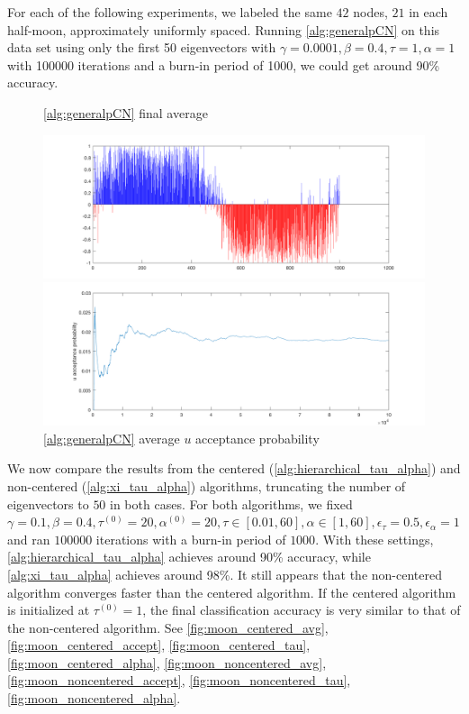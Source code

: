 \documentclass{siamart1116}
\begin{document}
For each of the following experiments, we labeled the same $42$ nodes, $21$ in each half-moon, approximately uniformly spaced. Running \cref{alg:generalpCN} on this data set using only the first 50 eigenvectors with $\gamma=0.0001,\beta=0.4,\tau=1,\alpha=1$ with 100000 iterations and a burn-in period of 1000, we could get around 90\% accuracy.
\begin{figure}[!htb]
    \begin{minipage}{0.48\textwidth}
        \centering
        \caption{\label{fig:moon_mcmc_gamma_avg} \cref{alg:generalpCN} final average}
        \includegraphics[width=\linewidth]{graphics/moons/mcmc_gamma/u_avg.png}
    \end{minipage} \hfill
    \begin{minipage}{0.48\textwidth}
        \centering
        \caption{\label{fig:moon_mcmc_gamma_accept} \cref{alg:generalpCN} average $u$ acceptance probability}
        \includegraphics[width=\linewidth]{graphics/moons/mcmc_gamma/u_accept.png}
    \end{minipage}
\end{figure}

We now compare the results from the centered (\cref{alg:hierarchical_tau_alpha}) and non-centered (\cref{alg:xi_tau_alpha}) algorithms, truncating the number of eigenvectors to $50$ in both cases. For both algorithms, we fixed $\gamma = 0.1, \beta = 0.4, \tau^{(0)}=20,\alpha^{(0)}=20,\tau\in[0.01,60],\alpha\in[1,60],\epsilon_\tau=0.5,\epsilon_\alpha=1$ and ran $100000$ iterations with a burn-in period of $1000$. With these settings, \cref{alg:hierarchical_tau_alpha} achieves around 90\% accuracy, while \cref{alg:xi_tau_alpha} achieves around 98\%. It still appears that the non-centered algorithm converges faster than the centered algorithm. If the centered algorithm is initialized at $\tau^{(0)} = 1$, the final classification accuracy is very similar to that of the non-centered algorithm. See \cref{fig:moon_centered_avg}, \cref{fig:moon_centered_accept}, \cref{fig:moon_centered_tau}, \cref{fig:moon_centered_alpha}, \cref{fig:moon_noncentered_avg}, \cref{fig:moon_noncentered_accept}, \cref{fig:moon_noncentered_tau}, \cref{fig:moon_noncentered_alpha}.
\end{document}
